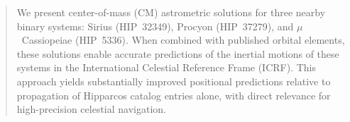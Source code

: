 \documentclass[linenumbers,trackchanges]{aastex701}
\begin{document}
\author[orcid=0000-0001-8017-5115,gname=Gregory,sname=Hennessy]{Gregory S. Hennessy}

\author[orcid=0000-0002-2768-1606,gname=Julien,sname=Frouard]{Julien Frouard} 

\author[gname=Rachel,sname=Matson]{Rachel Matson}

\author[gname=Brian,sname=Mason]{Brian Mason}

\author[orcid=0000-0001-7076-344X,gname=George,sname=Kaplan]{George Kaplan}

\begin{abstract}

We present center-of-mass (CM) astrometric solutions for three nearby binary systems: Sirius (HIP~32349), Procyon
(HIP~37279), and $\mu$~Cassiopeiae (HIP~5336). When combined with published orbital elements, these solutions enable
accurate predictions of the inertial motions of these systems in the International Celestial Reference Frame
(ICRF). This approach yields substantially improved positional predictions relative to propagation of Hipparcos catalog
entries alone, with direct relevance for high-precision celestial navigation. 
\end{abstract}

\end{document}
